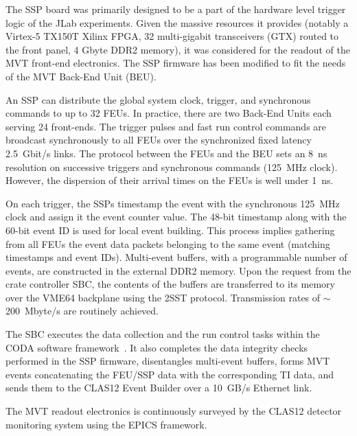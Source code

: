 The SSP board was primarily designed to be a part of the hardware level trigger logic of the JLab experiments. Given the
massive resources it provides (notably a Virtex-5 TX150T Xilinx FPGA, 32 multi-gigabit transceivers (GTX) routed to the
front panel, 4 Gbyte DDR2 memory), it was considered for the readout of the MVT front-end electronics. The SSP firmware
has been modified to fit the needs of the MVT Back-End Unit (BEU).

An SSP can distribute the global system clock, trigger, and synchronous commands to up to 32 FEUs. In practice, there are
two Back-End Units each serving 24 front-ends. The trigger pulses and fast run control commands are broadcast synchronously
to all FEUs over the synchronized fixed latency 2.5~Gbit/s links. The protocol between the FEUs and the BEU sets an 8~ns
resolution on successive triggers and synchronous commands (125~MHz clock). However, the dispersion of their arrival times
on the FEUs is well under 1~ns.

On each trigger, the SSPs timestamp the event with the synchronous 125~MHz clock and assign it the event counter value. The
48-bit timestamp along with the 60-bit event ID is used for local event building. This process implies gathering from all FEUs
the event data packets belonging to the same event (matching timestamps and event IDs). Multi-event buffers, with a
programmable number of events, are constructed in the external DDR2 memory. Upon the request from the crate controller
SBC, the contents of the buffers are transferred to its memory over the VME64 backplane using the 2SST protocol. Transmission
rates of $\sim$200~Mbyte/s are routinely achieved.

The SBC executes the data collection and the run control tasks within the CODA software framework~\cite{CODA}. It also
completes the data integrity checks performed in the SSP firmware, disentangles multi-event buffers, forms MVT events
concatenating the FEU/SSP data with the corresponding TI data, and sends them to the CLAS12 Event Builder over a 10~GB/s
Ethernet link.

The MVT readout electronics is continuously surveyed by the CLAS12 detector monitoring system using the EPICS framework.
